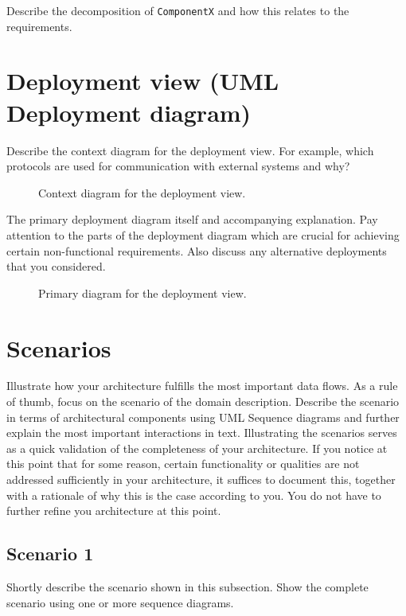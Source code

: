 \documentclass[a4paper,10pt]{article}
\begin{document}
Describe the decomposition of \texttt{ComponentX} and how this relates to the
requirements.

\section{Deployment view (UML Deployment diagram)}\label{sec:deployment}
Describe the context diagram for the deployment view.
For example, which protocols are used for communication with external systems
and why?

\begin{figure}[!htp]
    \centering
    \caption{Context diagram for the deployment view.}\label{fig:depl_context}
\end{figure}

The primary deployment diagram itself and accompanying explanation.
Pay attention to the parts of the deployment diagram which are crucial for
achieving certain non-functional requirements.
Also discuss any alternative deployments that you considered.

\begin{figure}[!htp]
    \centering
    \caption{Primary diagram for the deployment view.}\label{fig:depl_primary}
\end{figure}

\section{Scenarios}\label{sec:scenarios}
Illustrate how your architecture fulfills the most important data flows.
As a rule of thumb, focus on the scenario of the domain description.
Describe the scenario in terms of architectural components using UML Sequence
diagrams and further explain the most important interactions in text.
Illustrating the scenarios serves as a quick validation of the completeness of
your architecture.
If you notice at this point that for some reason, certain functionality or
qualities are not addressed sufficiently in your architecture, it suffices to
document this, together with a rationale of why this is the case according to
you.
You do not have to further refine you architecture at this point.

\subsection{Scenario 1}
Shortly describe the scenario shown in this subsection.
Show the complete scenario using one or more sequence diagrams.
\end{document}

